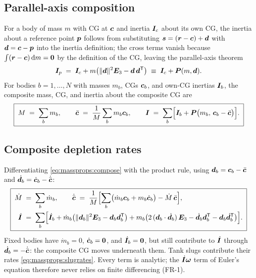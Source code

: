 \subsection{Parallel-axis composition}

For a body of mass $m$ with CG at $\bm{c}$ and inertia $\bm{I}_c$ about
its own CG, the inertia about a reference point $\bm{p}$ follows from
substituting $\bm{s} = (\bm{r} - \bm{c}) + \bm{d}$ with
$\bm{d} = \bm{c} - \bm{p}$ into the inertia definition; the cross terms
vanish because $\int (\bm{r} - \bm{c})\,\mathrm{d}m = \bm{0}$ by the
definition of the CG, leaving the parallel-axis theorem
\begin{equation}
  \bm{I}_p \;=\; \bm{I}_c
    + m \bigl(\lVert\bm{d}\rVert^2 \bm{E}_3
    - \bm{d}\,\bm{d}^{\mathsf{T}}\bigr)
  \;\equiv\; \bm{I}_c + \bm{P}(m, \bm{d}).
  \label{eq:massprops:parallelaxis}
\end{equation}
For bodies $b = 1, \dots, N$ with masses $m_b$, CGs $\bm{c}_b$, and
own-CG inertias $\bm{I}_b$, the composite mass, CG, and inertia about
the composite CG are
\begin{equation}
  \boxed{\;
  M \;=\; \sum_b m_b, \qquad
  \bar{\bm{c}} \;=\; \frac{1}{M} \sum_b m_b \bm{c}_b, \qquad
  \bm{I} \;=\; \sum_b \Bigl[ \bm{I}_b
    + \bm{P}\bigl(m_b,\, \bm{c}_b - \bar{\bm{c}}\bigr) \Bigr].\;}
  \label{eq:massprops:compose}
\end{equation}

\subsection{Composite depletion rates}

Differentiating \eqref{eq:massprops:compose} with the product rule,
using $\bm{d}_b = \bm{c}_b - \bar{\bm{c}}$ and
$\dot{\bm{d}}_b = \dot{\bm{c}}_b - \dot{\bar{\bm{c}}}$:
\begin{equation}
  \boxed{\;
  \begin{aligned}
  \dot{M} &\;=\; \sum_b \dot{m}_b, \qquad
  \dot{\bar{\bm{c}}} \;=\; \frac{1}{M} \Bigl[ \sum_b
    \bigl( \dot{m}_b \bm{c}_b + m_b \dot{\bm{c}}_b \bigr)
    - \dot{M}\,\bar{\bm{c}} \Bigr], \\
  \dot{\bm{I}} &\;=\; \sum_b \Bigl[ \dot{\bm{I}}_b
    + \dot{m}_b \bigl(\lVert\bm{d}_b\rVert^2 \bm{E}_3
      - \bm{d}_b \bm{d}_b^{\mathsf{T}}\bigr)
    + m_b \bigl( 2\,(\bm{d}_b \cdot \dot{\bm{d}}_b)\, \bm{E}_3
      - \dot{\bm{d}}_b \bm{d}_b^{\mathsf{T}}
      - \bm{d}_b \dot{\bm{d}}_b^{\mathsf{T}} \bigr) \Bigr].
  \end{aligned}\;}
  \label{eq:massprops:composerates}
\end{equation}
Fixed bodies have $\dot{m}_b = 0$, $\dot{\bm{c}}_b = \bm{0}$, and
$\dot{\bm{I}}_b = \bm{0}$, but still contribute to $\dot{\bm{I}}$
through $\dot{\bm{d}}_b = -\dot{\bar{\bm{c}}}$: the composite CG moves
underneath them. Tank slugs contribute their rates
\eqref{eq:massprops:slugrates}. Every term is analytic; the
$\dot{\bm{I}}\bm{\omega}$ term of Euler's equation therefore never
relies on finite differencing (FR-1).


